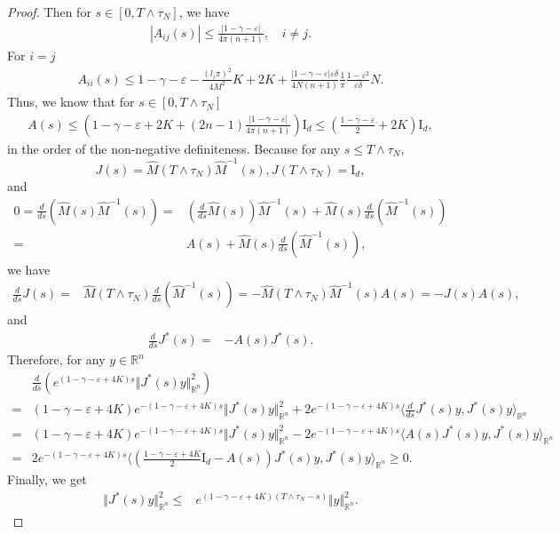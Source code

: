 \documentclass[10pt,a4paper]{amsart}
\begin{document}
\begin{proof}
		Then for $s\in [0,T\wedge\tau_{N}]$, we have 
		\begin{align*}
			|A_{ij}(s)|\leq \frac{|1-\gamma-\varepsilon|}{4\pi(n+1)},\quad i\neq j.
		\end{align*}
		For $i=j$
		\begin{align*}
			A_{ii}(s)\leq 1-\gamma-\varepsilon-\frac{(l_{i}\pi)^{2}}{4M^{2}}K+2K+ \frac{|1-\gamma-\varepsilon|\varepsilon\delta}{4N(n+1)}\frac{1}{\pi}\frac{1-\varepsilon^{2}}{\varepsilon\delta}N.
		\end{align*}
		Thus, we know that for $s\in [0,T\wedge\tau_{N}]$
		\begin{align*}
			A(s)\leq \left( 1-\gamma-\varepsilon+2K+(2n-1) \frac{|1-\gamma-\varepsilon|}{4\pi(n+1)}\right)\text{I}_{d}\leq\left( \frac{1-\gamma-\varepsilon}{2}+2K\right)\text{I}_{d},
		\end{align*}
		in the order of the non-negative definiteness. Because for any $s\leq T\wedge\tau_{N}$, 
		$$J(s)=\hat{M}(T\wedge\tau_{N})\hat{M}^{-1}(s),J(T\wedge\tau_{N})=\text{I}_{d},$$
		and
		\begin{align*}
		0=\frac{d}{ds}(\hat{M}(s)\hat{M}^{-1}(s))=&(\frac{d}{ds}\hat{M}(s))\hat{M}^{-1}(s)+\hat{M}(s)\frac{d}{ds}(\hat{M}^{-1}(s))\\
		=&A(s)+\hat{M}(s)\frac{d}{ds}(\hat{M}^{-1}(s)),
		\end{align*}
		we have
		\begin{align*}
			\frac{d}{ds}J(s)=&\hat{M}(T\wedge\tau_{N})\frac{d}{ds}(\hat{M}^{-1}(s))=-\hat{M}(T\wedge\tau_{N})\hat{M}^{-1}(s)A(s)=-J(s)A(s),
		\end{align*}
		and
			\begin{align*}
			\frac{d}{ds}J^{*}(s)=&-A(s)J^{*}(s).
		\end{align*}
		Therefore, for any $y\in\mathbb{R}^{n}$
		\begin{equation}\label{eq:stopoperestimete}
			\begin{split}
				&\frac{d}{ds}(e^{(1-\gamma-\varepsilon+4K)s}\Vert J^{*}(s)y\Vert^{2}_{\mathbb{R}^{n}})\\
				=&(1-\gamma-\varepsilon+4K)e^{-(1-\gamma-\varepsilon+4K)s}\Vert J^{*}(s)y\Vert^{2}_{\mathbb{R}^{n}}+2e^{-(1-\gamma-\varepsilon+4K)s}\langle \frac{d}{ds}J^{*}(s)y,J^{*}(s)y\rangle_{\mathbb{R}^{n}}\\
				=&(1-\gamma-\varepsilon+4K)e^{-(1-\gamma-\varepsilon+4K)s}\Vert J^{*}(s)y\Vert^{2}_{\mathbb{R}^{n}}-2e^{-(1-\gamma-\varepsilon+4K)s}\langle A(s)J^{*}(s)y,J^{*}(s)y\rangle_{\mathbb{R}^{n}}\\
				=&2e^{-(1-\gamma-\varepsilon+4K)s}\langle (\frac{1-\gamma-\varepsilon+4K}{2}\text{I}_{d}-A(s))J^{*}(s)y,J^{*}(s)y\rangle_{\mathbb{R}^{n}}\geq 0.
			\end{split}
		\end{equation}	
		Finally, we get
		\begin{align*}
			\Vert J^{*}(s)y\Vert^{2}_{\mathbb{R}^{n}}\leq&e^{(1-\gamma-\varepsilon+4K)(T\wedge\tau_{N}-s)}\Vert y\Vert^{2}_{\mathbb{R}^{n}}.
		\end{align*}
	\end{proof}
\end{document}
